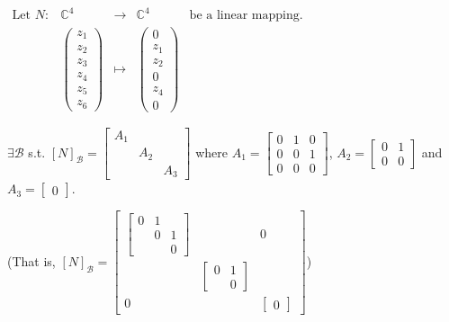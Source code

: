 \documentclass[11pt,fleqn]{book} %
\begin{document}
\begin{example}
{~~~}

    $\begin{matrix} \text{Let } N: &\mathbb{C}^4 &\to &\mathbb{C}^4 &\text{be a linear mapping. }\\ &\begin{pmatrix}z_1\\z_2\\z_3\\z_4\\z_5\\z_6\end{pmatrix} &\mapsto &\begin{pmatrix}0\\z_1\\z_2\\0\\z_4\\0\end{pmatrix} \end{matrix}$
    
    $\exists \mathcal{B}$ s.t. $[N]_\mathcal{B} = \begin{bmatrix} A_1 \\ &A_2 \\ & &A_3 \end{bmatrix}$ where $A_1 = \begin{bmatrix} 0 &1 &0 \\ 0 &0 &1 \\ 0 &0 &0 \end{bmatrix}$, $A_2 = \begin{bmatrix} 0 &1 \\ 0 &0 \end{bmatrix}$ and $A_3 = \begin{bmatrix} 0 \end{bmatrix}$.
    
    (That is, $[N]_\mathcal{B} = \begin{bmatrix} \begin{bmatrix}0 &1 \\ &0 &1 \\ & &0\end{bmatrix} & &0 \\ &\begin{bmatrix}0 &1 \\ &0\end{bmatrix} \\ 0 & &\begin{bmatrix}0\end{bmatrix} \end{bmatrix}$)
    

\end{example}
\end{document}
